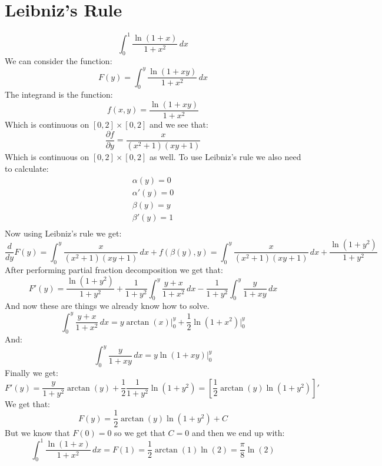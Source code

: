 \documentclass{article}
\theoremstyle{plain}
\begin{document}
	\section{Leibniz's Rule}
	\[
		\int_{0}^{1}{\frac{\ln(1+x)}{1+x^2}\,dx}
	\]
	We can consider the function:
	\[
		F(y) = \int_{0}^{y}{\frac{\ln(1+xy)}{1+x^2}\,dx}
	\]
	The integrand is the function:
	\[
		f(x,y) = \frac{\ln(1+xy)}{1+x^2}
	\]
	Which is continuous on $[0,2]\times[0,2]$ and we see that:
	\[
		\frac{\partial f}{\partial y} = 
		\dfrac{x}{\left(x^2+1\right)\left(xy+1\right)}
	\]
	Which is continuous on $[0,2]\times[0,2]$ as well. To use Leibniz's
	rule we also need to calculate:
	\begin{align*}
		\alpha(y) = 0 \\
		\alpha'(y) = 0 \\
		\beta(y) = y \\
		\beta'(y) = 1 \\
	\end{align*}
	Now using Leibniz's rule we get:
	\[
		\frac{d}{dy}F(y) = 
		\int_{0}^{y}{\dfrac{x}{\left(x^2+1\right)\left(xy+1\right)}\,dx} + 
		f(\beta(y),y) = 
		\int_{0}^{y}{\dfrac{x}{\left(x^2+1\right)\left(xy+1\right)}\,dx} +
		\frac{\ln(1+y^2)}{1+y^2}
	\]
	After performing partial fraction decomposition we get that:
	\[
		F'(y) = 
		\frac{\ln(1+y^2)}{1+y^2} + 
		\frac{1}{1+y^2}\int_{0}^{y}{\frac{y+x}{1+x^2}\,dx} -
		\frac{1}{1+y^2}\int_{0}^{y}{\frac{y}{1+xy}\,dx}
	\]
	And now these are things we already know how to solve.
	\[
		\int_{0}^{y}{\frac{y+x}{1+x^2}\,dx} = 
		y\arctan(x)\biggr\vert^{y}_{0} + 
		\frac{1}{2}\ln(1+x^2)\biggr\vert^{y}_{0}
	\]
	And:
	\[
		\int_{0}^{y}{\frac{y}{1+xy}\,dx} = 
		y\ln(1+xy)\biggr\vert^{y}_{0}
	\]
	Finally we get:
	\[
		F'(y) = 
		\frac{y}{1+y^2}\arctan(y) + 
		\frac{1}{2}\frac{1}{1+y^2}\ln(1+y^2) = 
		\left[\frac{1}{2} \arctan(y)\ln(1+y^2)\right]'
	\]
	We get that:
	\[
		F(y) = \frac{1}{2} \arctan(y)\ln(1+y^2) + C
	\]
	But we know that $F(0) = 0$ so we get that $C = 0$ and then we end up 
	with:
	\[
		\int_{0}^{1}{\frac{\ln(1+x)}{1+x^2}\,dx} = F(1) = 
		\frac{1}{2} \arctan(1)\ln(2) = \frac{\pi}{8}\ln(2)
	\]
	
	\newpage
	
\end{document}
